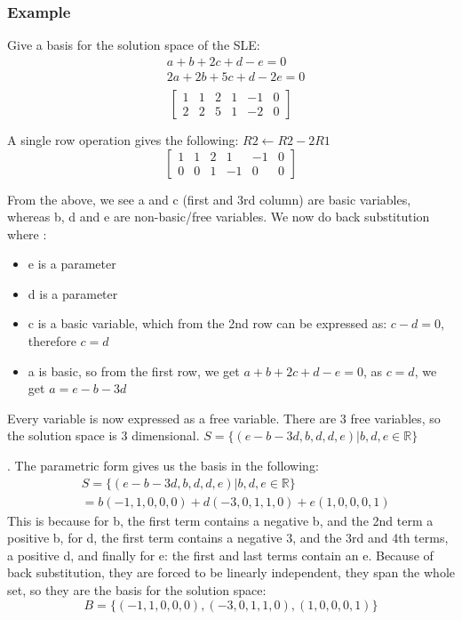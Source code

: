\documentclass[11pt]{book}
\begin{document}
{{\subsubsection{Example}
\par{Give a basis for the solution space of the SLE: }
\begin{align*}
	& a+b+2c+d-e=0 \\
	& 2a+2b+5c+d-2e=0 \\
\end{align*}
\[
	\left[
	\begin{array}{ccccc|c}
		1 & 1 & 2 & 1 & -1 & 0 \\
		2 & 2 & 5 & 1 & -2 & 0
	\end{array}
	\right]
\] 
\par{A single row operation gives the following: $R2\leftarrow R2-2R1$}
\[
	\left[
		\begin{array}{ccccc|c}
			1 & 1 & 2 & 1 & -1 & 0 \\
			0 & 0 & 1 & -1 & 0 & 0
		\end{array}
	\right]
\] 
\par{From the above, we see a and c (first and 3rd column) are basic variables, whereas b, d and e are non-basic/free variables. We now do back substitution where :
\begin{itemize}
	\item{e is a parameter}
	\item{d is a parameter}
	\item{c is a basic variable, which from the 2nd row can be expressed as: $c-d=0$, therefore  $c=d$}
	\item{a is basic, so from the first row, we get $a+b+2c+d-e=0$, as $c=d$, we get  $a=e-b-3d$}
\end{itemize}
Every variable is now expressed as a free variable. There are 3 free variables, so the solution space is 3 dimensional. $S=\lbrace\left(e-b-3d, b, d, d, e\right)|b,d,e\in\mathbb{R}\rbrace$}. The parametric form gives us the basis in the following: 
\begin{align*}
& S=\lbrace\left(e-b-3d, b, d, d, e\right)|b,d,e\in\mathbb{R}\rbrace \\
& =b\left(-1,1,0,0,0\right)+d\left(-3,0,1,1,0\right)+e\left(1,0,0,0,1\right)
\end{align*}
This is because for b, the first term contains a negative b, and the 2nd term a positive b, for d, the first term contains a negative 3, and the 3rd and 4th terms, a positive d, and finally for e: the first and last terms contain an e. Because of back substitution, they are forced to be linearly independent, they span the whole set, so they are the basis for the solution space: \[
B =\lbrace\left(-1,1,0,0,0\right),\left(-3,0,1,1,0\right),\left(1,0,0,0,1\right)\rbrace
\]
}}
\end{document}
